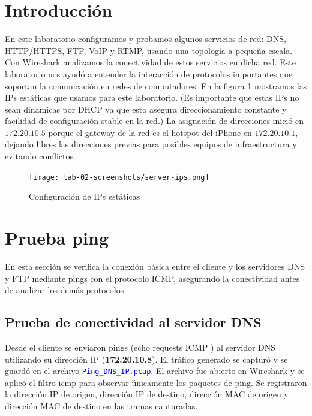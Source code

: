 \documentclass[10pt]{article}
\begin{document}
\section*{Introducción}
En este laboratorio configuramos y probamos algunos servicios de red: DNS, HTTP/HTTPS, FTP, VoIP y RTMP, usando una topología a pequeña escala. Con Wireshark analizamos la conectividad de estos servicios en dicha red. Este laboratorio nos ayudó a entender la interacción de protocolos importantes que soportan la comunicación en redes de computadores. En la figura 1 mostramos las IPs estáticas que usamos para este laboratorio. (Es importante que estas IPs no sean dinamicas por DHCP ya que esto asegura direccionamiento constante y facilidad de configuración stable en la red.) La asignación de direcciones inició en $172.20.10.5$ porque el gateway de la red es el hotspot del iPhone en $172.20.10.1$, dejando libres las direcciones previas para posibles equipos de infraestructura y evitando conflictos.


\begin{figure}[H]
    \centering
    \texttt{[image: lab-02-screenshots/server-ips.png]}
    \caption{Configuración de IPs estáticas}
\end{figure}


\renewcommand{\thesection}{8.\arabic{section}}
\setcounter{section}{0}
\section{Prueba ping}

En esta sección se verifica la conexión básica entre el cliente y los servidores DNS y FTP mediante pings con el protocolo ICMP, asegurando la conectividad antes de analizar los demás protocolos.

\subsection{Prueba de conectividad al servidor DNS}

Desde el cliente se enviaron pings (echo requests ICMP ) al servidor DNS utilizando su dirección IP (\textbf{172.20.10.8}). El tráfico generado se capturó y se guardó en el archivo \textcolor{blue}{\texttt{Ping\_DNS\_IP.pcap}}. El archivo fue abierto en Wireshark y se aplicó el filtro icmp para observar únicamente los paquetes de ping. Se registraron la dirección IP de origen, dirección IP de destino, dirección MAC de origen y dirección MAC de destino en las tramas capturadas.
\end{document}
